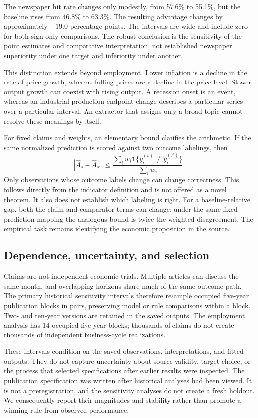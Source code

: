 The newspaper hit rate changes only modestly, from 57.6\% to 55.1\%, but the baseline rises from 46.8\% to 63.3\%. The resulting advantage changes by approximately $-19.0$ percentage points. The intervals are wide and include zero for both sign-only comparisons. The robust conclusion is the sensitivity of the point estimates and comparative interpretation, not established newspaper superiority under one target and inferiority under another.

This distinction extends beyond employment. Lower inflation is a decline in the rate of price growth, whereas falling prices are a decline in the price level. Slower output growth can coexist with rising output. A recession onset is an event, whereas an industrial-production endpoint change describes a particular series over a particular interval. An extractor that assigns only a broad topic cannot resolve these meanings by itself.

For fixed claims and weights, an elementary bound clarifies the arithmetic. If the same normalized prediction is scored against two outcome labelings, then
\begin{equation}
 |\widehat A_s-\widehat A_{s'}|
 \leq \frac{\sum_i w_i\mathbf{1}\{y_i^{(s)}\neq y_i^{(s')}\}}{\sum_i w_i}.
 \label{eq:bound}
\end{equation}
Only observations whose outcome labels change can change correctness. This follows directly from the indicator definition and is not offered as a novel theorem. It also does not establish which labeling is right. For a baseline-relative gap, both the claim and comparator terms can change; under the same fixed prediction mapping the analogous bound is twice the weighted disagreement. The empirical task remains identifying the economic proposition in the source.

\subsection{Dependence, uncertainty, and selection}
Claims are not independent economic trials. Multiple articles can discuss the same month, and overlapping horizons share much of the same outcome path. The primary historical sensitivity intervals therefore resample occupied five-year publication blocks in pairs, preserving model or rule comparisons within a block. Two- and ten-year versions are retained in the saved outputs. The employment analysis has 14 occupied five-year blocks; thousands of claims do not create thousands of independent business-cycle realizations.

These intervals condition on the saved observations, interpretations, and fitted outputs. They do not capture uncertainty about source validity, target choice, or the process that selected specifications after earlier results were inspected. The publication specification was written after historical analyses had been viewed. It is not a preregistration, and the sensitivity analyses do not create a fresh holdout. We consequently report their magnitudes and stability rather than promote a winning rule from observed performance.

